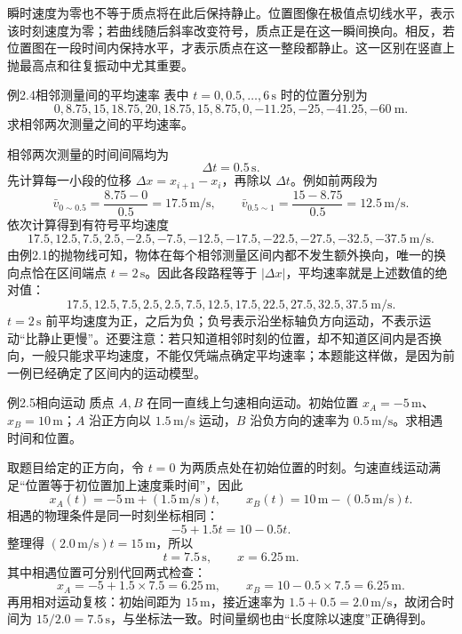 瞬时速度为零也不等于质点将在此后保持静止。位置图像在极值点切线水平，表示该时刻速度为零；若曲线随后斜率改变符号，质点正是在这一瞬间换向。相反，若位置图在一段时间内保持水平，才表示质点在这一整段都静止。这一区别在竖直上抛最高点和往复振动中尤其重要。

\begin{origexamplebox}{例2.4\quad 相邻测量间的平均速率}
表中 $t=0,0.5,\ldots,6\,\mathrm{s}$ 时的位置分别为
\[
0,8.75,15,18.75,20,18.75,15,8.75,0,-11.25,-25,-41.25,-60\ \mathrm{m}.
\]
求相邻两次测量之间的平均速率。
\end{origexamplebox}
\begin{xesolution}
相邻两次测量的时间间隔均为
\[
 \Delta t=0.5\,\mathrm s.
\]
先计算每一小段的位移 $\Delta x=x_{i+1}-x_i$，再除以 $\Delta t$。例如前两段为
\[
 \bar v_{0\sim0.5}=\frac{8.75-0}{0.5}=17.5\,\mathrm{m/s},
 \qquad
 \bar v_{0.5\sim1}=\frac{15-8.75}{0.5}=12.5\,\mathrm{m/s}.
\]
依次计算得到有符号平均速度
\[
17.5,12.5,7.5,2.5,-2.5,-7.5,-12.5,-17.5,-22.5,-27.5,-32.5,-37.5\ \mathrm{m/s}.
\]
由例2.1的抛物线可知，物体在每个相邻测量区间内都不发生额外换向，唯一的换向点恰在区间端点 $t=2\,\mathrm s$。因此各段路程等于 $|\Delta x|$，平均速率就是上述数值的绝对值：
\[
\boxed{17.5,12.5,7.5,2.5,2.5,7.5,12.5,17.5,22.5,27.5,32.5,37.5\ \mathrm{m/s}}.
\]
$t=2\,\mathrm{s}$ 前平均速度为正，之后为负；负号表示沿坐标轴负方向运动，不表示运动“比静止更慢”。还要注意：若只知道相邻时刻的位置，却不知道区间内是否换向，一般只能求平均速度，不能仅凭端点确定平均速率；本题能这样做，是因为前一例已经确定了区间内的运动模型。
\end{xesolution}

\begin{origexamplebox}{例2.5\quad 相向运动}
质点 $A,B$ 在同一直线上匀速相向运动。初始位置 $x_A=-5\,\mathrm m$、$x_B=10\,\mathrm m$；$A$ 沿正方向以 $1.5\,\mathrm{m/s}$ 运动，$B$ 沿负方向的速率为 $0.5\,\mathrm{m/s}$。求相遇时间和位置。
\end{origexamplebox}
\begin{xesolution}
取题目给定的正方向，令 $t=0$ 为两质点处在初始位置的时刻。匀速直线运动满足“位置等于初位置加上速度乘时间”，因此
\[
x_A(t)=-5\,\mathrm m+(1.5\,\mathrm{m/s})t,
\qquad
x_B(t)=10\,\mathrm m-(0.5\,\mathrm{m/s})t.
\]
相遇的物理条件是同一时刻坐标相同：
\[
-5+1.5t=10-0.5t.
\]
整理得 $(2.0\,\mathrm{m/s})t=15\,\mathrm m$，所以
\[
\boxed{t=7.5\,\mathrm s},\qquad
\boxed{x=6.25\,\mathrm m}.
\]
其中相遇位置可分别代回两式检查：
\[
x_A=-5+1.5\times7.5=6.25\,\mathrm m,
\qquad
x_B=10-0.5\times7.5=6.25\,\mathrm m.
\]
再用相对运动复核：初始间距为 $15\,\mathrm m$，接近速率为
$1.5+0.5=2.0\,\mathrm{m/s}$，故闭合时间为 $15/2.0=7.5\,\mathrm s$，与坐标法一致。时间量纲也由“长度除以速度”正确得到。
\end{xesolution}

